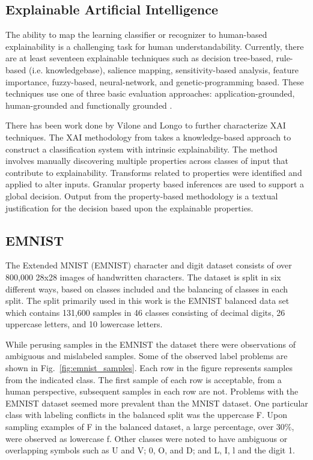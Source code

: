\documentclass[conference]{IEEEtran}
\begin{document}
\subsection{Explainable Artificial Intelligence}

The ability to map the learning classifier or recognizer to human-based
explainability is a challenging task for human understandability.  Currently,
there are at least seventeen explainable techniques such as decision tree-based,
rule-based (i.e. knowledgebase), salience mapping, sensitivity-based analysis,
feature importance, fuzzy-based, neural-network, and genetic-programming based.
These techniques use one of three basic evaluation approaches:
application-grounded, human-grounded and functionally grounded
\cite{Arrieta2020ExplainableAI,Survey18,Fuzzy19,Hagras18,GP18}.


There has been work done by Vilone and Longo \cite{vilone2020explainable} to
further characterize XAI techniques.  The XAI methodology from \cite{whitten21}
takes a knowledge-based approach to construct a classification system with
intrinsic explainability.  The method involves manually discovering multiple
properties across classes of input that contribute to explainability.
Transforms related to properties were identified and applied to alter inputs.
Granular property based inferences are used to support a global decision.
Output from the property-based methodology is a textual justification for the
decision based upon the explainable properties.

\subsection{EMNIST}

The Extended MNIST (EMNIST)\cite{cohen2017emnist} character and digit dataset
consists of over 800,000 28x28 images of handwritten characters.  The dataset is
split in six different ways, based on classes included and the balancing of
classes in each split.  The split primarily used in this work is the EMNIST
balanced data set which contains 131,600 samples in 46 classes consisting of
decimal digits, 26 uppercase letters, and 10 lowercase letters.

While perusing samples in the EMNIST the dataset there were observations of
ambiguous and mislabeled samples. Some of the observed label problems are shown
in Fig.~\ref{fig:emnist_samples}. Each row in the figure represents samples from
the indicated class.  The first sample of each row is acceptable, from a human
perspective, subsequent samples in each row are not. Problems with the EMNIST dataset
seemed more prevalent than the MNIST dataset. One particular
class with labeling conflicts in the balanced split was the uppercase F.  Upon
sampling examples of F in the balanced dataset, a large percentage, over 30\%,
were observed as lowercase f. Other classes were noted to have ambiguous or
overlapping symbols such as U and V; $0$, O, and D; and L, I, l and the digit 1.
\end{document}
